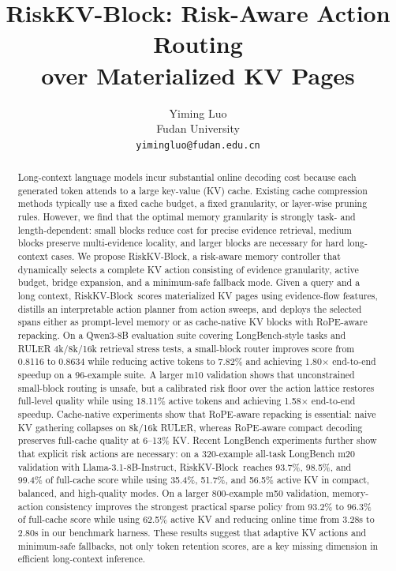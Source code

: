 \documentclass{article}
\title{RiskKV-Block: Risk-Aware Action Routing\\over Materialized KV Pages}
\author{
Yiming Luo\\
Fudan University\\
\texttt{yimingluo@fudan.edu.cn}
}
\newcommand{\method}{RiskKV-Block}
\begin{document}
\maketitle

\begin{abstract}
Long-context language models incur substantial online decoding cost because each generated token attends to a large key-value (KV) cache.
Existing cache compression methods typically use a fixed cache budget, a fixed granularity, or layer-wise pruning rules.
However, we find that the optimal memory granularity is strongly task- and length-dependent: small blocks reduce cost for precise evidence retrieval, medium blocks preserve multi-evidence locality, and larger blocks are necessary for hard long-context cases.
We propose \method, a risk-aware memory controller that dynamically selects a complete KV action consisting of evidence granularity, active budget, bridge expansion, and a minimum-safe fallback mode.
Given a query and a long context, \method\ scores materialized KV pages using evidence-flow features, distills an interpretable action planner from action sweeps, and deploys the selected spans either as prompt-level memory or as cache-native KV blocks with RoPE-aware repacking.
On a Qwen3-8B evaluation suite covering LongBench-style tasks and RULER 4k/8k/16k retrieval stress tests, a small-block router improves score from 0.8116 to 0.8634 while reducing active tokens to 7.82\% and achieving 1.80$\times$ end-to-end speedup on a 96-example suite.
A larger m10 validation shows that unconstrained small-block routing is unsafe, but a calibrated risk floor over the action lattice restores full-level quality while using 18.11\% active tokens and achieving 1.58$\times$ end-to-end speedup.
Cache-native experiments show that RoPE-aware repacking is essential: naive KV gathering collapses on 8k/16k RULER, whereas RoPE-aware compact decoding preserves full-cache quality at 6--13\% KV.
Recent LongBench experiments further show that explicit risk actions are necessary: on a 320-example all-task LongBench m20 validation with Llama-3.1-8B-Instruct, \method\ reaches 93.7\%, 98.5\%, and 99.4\% of full-cache score while using 35.4\%, 51.7\%, and 56.5\% active KV in compact, balanced, and high-quality modes.
On a larger 800-example m50 validation, memory-action consistency improves the strongest practical sparse policy from 93.2\% to 96.3\% of full-cache score while using 62.5\% active KV and reducing online time from 3.28s to 2.80s in our benchmark harness.
These results suggest that adaptive KV actions and minimum-safe fallbacks, not only token retention scores, are a key missing dimension in efficient long-context inference.
\end{abstract}
\end{document}
